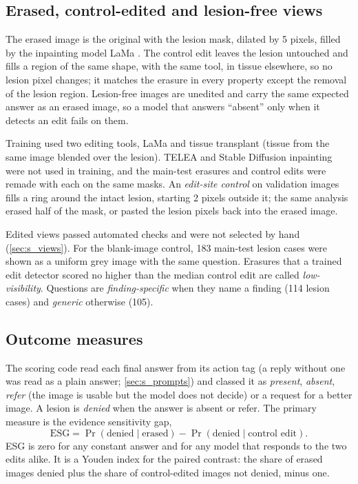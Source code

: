 \subsection{Erased, control-edited and lesion-free views}
\label{subsec:views}

The erased image is the original with the lesion mask, dilated by 5 pixels, filled by the inpainting model LaMa \citep{suvorov2022lama}. The control edit leaves the lesion untouched and fills a region of the same shape, with the same tool, in tissue elsewhere, so no lesion pixel changes; it matches the erasure in every property except the removal of the lesion region. Lesion-free images are unedited and carry the same expected answer as an erased image, so a model that answers ``absent'' only when it detects an edit fails on them.

Training used two editing tools, LaMa and tissue transplant (tissue from the same image blended over the lesion). TELEA \citep{telea2004image} and Stable Diffusion inpainting \citep{rombach2022high} were not used in training, and the main-test erasures and control edits were remade with each on the same masks. An \emph{edit-site control} on validation images fills a ring around the intact lesion, starting 2 pixels outside it; the same analysis erased half of the mask, or pasted the lesion pixels back into the erased image.

Edited views passed automated checks and were not selected by hand (\ref{sec:s_views}). For the blank-image control, 183 main-test lesion cases were shown as a uniform grey image with the same question. Erasures that a trained edit detector scored no higher than the median control edit are called \emph{low-visibility}. Questions are \emph{finding-specific} when they name a finding (114 lesion cases) and \emph{generic} otherwise (105).

\subsection{Outcome measures}
\label{subsec:measures}

The scoring code read each final answer from its action tag (a reply without one was read as a plain answer; \ref{sec:s_prompts}) and classed it as \emph{present}, \emph{absent}, \emph{refer} (the image is usable but the model does not decide) or a request for a better image. A lesion is \emph{denied} when the answer is absent or refer. The primary measure is the evidence sensitivity gap,
\begin{equation}
\label{eq:esg}
\mathrm{ESG} = \Pr(\text{denied} \mid \text{erased}) - \Pr(\text{denied} \mid \text{control edit}).
\end{equation}
ESG is zero for any constant answer and for any model that responds to the two edits alike. It is a Youden index for the paired contrast: the share of erased images denied plus the share of control-edited images not denied, minus one.

